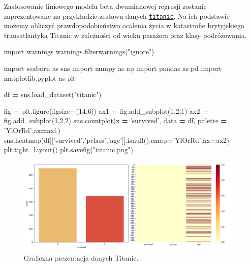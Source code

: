 \documentclass[polish,]{book}
\newenvironment{Shaded}{\begin{snugshade}}{\end{snugshade}}
\newcommand{\DecValTok}[1]{\textcolor[rgb]{0.00,0.00,0.81}{#1}}
\newcommand{\ImportTok}[1]{#1}
\newcommand{\NormalTok}[1]{#1}
\newcommand{\OperatorTok}[1]{\textcolor[rgb]{0.81,0.36,0.00}{\textbf{#1}}}
\newcommand{\StringTok}[1]{\textcolor[rgb]{0.31,0.60,0.02}{#1}}
\begin{document}
Zastosowanie liniowego modelu beta dwumianowej regresji zostanie zaprezentowane na przykładzie zestawu danych \href{https://github.com/mwaskom/seaborn-data/blob/master/titanic.csv}{\texttt{titanic}}. Na ich podstawie
możemy obliczyć prawdopodobieństwo ocalenia życia w katastrofie brytyjskiego transatlantyka Titanic w
zależności od wieku pasażera oraz klasy podróżowania.

\begin{Shaded}
\begin{Highlighting}[]
\ImportTok{import}\NormalTok{ warnings}
\NormalTok{warnings.filterwarnings(}\StringTok{"ignore"}\NormalTok{)}

\ImportTok{import}\NormalTok{ seaborn }\ImportTok{as}\NormalTok{ sns}
\ImportTok{import}\NormalTok{ numpy }\ImportTok{as}\NormalTok{ np}
\ImportTok{import}\NormalTok{ pandas }\ImportTok{as}\NormalTok{ pd}
\ImportTok{import}\NormalTok{ matplotlib.pyplot }\ImportTok{as}\NormalTok{ plt}
  
\NormalTok{df }\OperatorTok{=}\NormalTok{ sns.load_dataset(}\StringTok{"titanic"}\NormalTok{)}

\NormalTok{fig }\OperatorTok{=}\NormalTok{ plt.figure(figsize}\OperatorTok{=}\NormalTok{(}\DecValTok{14}\NormalTok{,}\DecValTok{6}\NormalTok{))}
\NormalTok{ax1 }\OperatorTok{=}\NormalTok{ fig.add_subplot(}\DecValTok{1}\NormalTok{,}\DecValTok{2}\NormalTok{,}\DecValTok{1}\NormalTok{)}
\NormalTok{ax2 }\OperatorTok{=}\NormalTok{ fig.add_subplot(}\DecValTok{1}\NormalTok{,}\DecValTok{2}\NormalTok{,}\DecValTok{2}\NormalTok{)}
\NormalTok{sns.countplot(x }\OperatorTok{=} \StringTok{'survived'}\NormalTok{, data }\OperatorTok{=}\NormalTok{ df, palette }\OperatorTok{=} \StringTok{'YlOrRd'}\NormalTok{,ax}\OperatorTok{=}\NormalTok{ax1)}
\NormalTok{sns.heatmap(df[[}\StringTok{'survived'}\NormalTok{,}\StringTok{'pclass'}\NormalTok{,}\StringTok{'age'}\NormalTok{]].isnull(),cmap}\OperatorTok{=}\StringTok{'YlOrRd'}\NormalTok{,ax}\OperatorTok{=}\NormalTok{ax2)}
\NormalTok{plt.tight_layout()}
\NormalTok{plt.savefig(}\StringTok{"titanic.png"}\NormalTok{)}
\end{Highlighting}
\end{Shaded}

\begin{figure}[h]

{\centering \includegraphics[width=1\linewidth]{titanic} 

}

\caption{Graficzna prezentacja danych Titanic.}\label{fig:titanic}
\end{figure}
\end{document}
